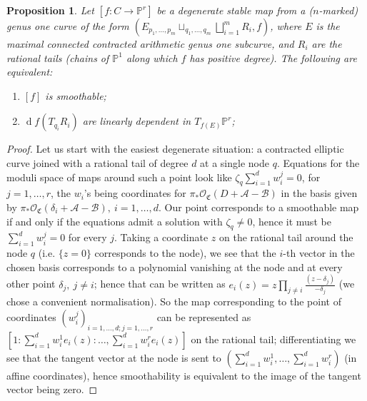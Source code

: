 \documentclass[11pt]{amsart}
\newcommand{\PP}{\mathbb P}
\renewcommand{\to}{\rightarrow}
\newcommand{\A}{\mathcal A}
\newcommand{\B}{\mathcal B}
\theoremstyle{plain}
\newtheorem{prop}[thm]{Proposition}
\theoremstyle{definition}
\begin{document}
\begin{prop}\label{smoothability_with_eqn}
Let $[f\colon C\to \PP^r]$ be a degenerate stable map from a ($n$-marked) genus one curve of the form $(E {}_{p_1,\ldots,p_m}\sqcup_{q_1,\ldots,q_m}\bigsqcup_{i=1}^m R_i,f)$, where $E$ is the maximal connected contracted arithmetic genus one subcurve, and $R_i$ are the rational tails (chains of $\PP^1$ along which $f$ has positive degree). The following are equivalent:
\begin{enumerate}
\item $[f]$ is smoothable;
\item $\operatorname{d}\!f(T_{q_i}R_i)$ are linearly dependent in $T_{f(E)}\PP^r$;
\end{enumerate}
\end{prop}
\begin{proof}
 Let us start with the easiest degenerate situation: a contracted elliptic curve joined with a rational tail of degree $d$ at a single node $q$. Equations for the moduli space of maps around such a point look like $\zeta_q\sum_{i=1}^d w_i^j=0$, for $j=1,\ldots,r$, the $w_i$'s being coordinates for $\pi_*\mathcal O_{\mathfrak C}(D+\A-\B)$ in the basis given by $\pi_*\mathcal O_{\mathfrak C}(\delta_i+\A-\B),\ i=1,\ldots,d$. Our point corresponds to a smoothable map if and only if the equations admit a solution with $\zeta_q\neq 0$, hence it must be $\sum_{i=1}^d w_i^j=0$ for every $j$. Taking a coordinate $z$ on the rational tail around the node $q$ (i.e. $\{z=0\}$ corresponds to the node), we see that the $i$-th vector in the chosen basis corresponds to a polynomial vanishing at the node and at every other point $\delta_j,\ j\neq i$; hence that can be written as $e_i(z)=z\prod_{j\neq i}\frac{(z-\delta_j)}{-\delta_j}$ (we chose a convenient normalisation). So the map corresponding to the point of coordinates $(w_i^j)_{i=1,\ldots,d;j=1,\ldots,r}$ can be represented as $[1:\sum_{i=1}^d w_i^1e_i(z):\ldots,\sum_{i=1}^d w_i^re_i(z)]$ on the rational tail; differentiating we see that the tangent vector at the node is sent to $(\sum_{i=1}^d w_i^1,\ldots,\sum_{i=1}^d w_i^r)$ (in affine coordinates), hence smoothability is equivalent to the image of the tangent vector being zero.
 

\end{proof}
\end{document}
